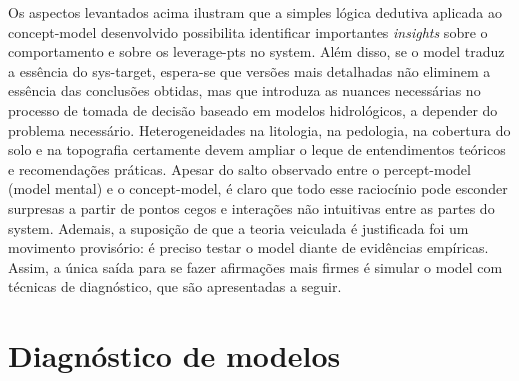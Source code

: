 \documentclass[./main.tex]{subfiles}
\begin{document}
\par Os aspectos levantados acima ilustram que a simples lógica dedutiva aplicada ao \gls{concept-model} desenvolvido possibilita identificar importantes \textit{insights} sobre o comportamento e sobre os \gls{leverage-pts} no \gls{system}. Além disso, se o \gls{model} traduz a essência do \gls{sys-target}, espera-se que versões mais detalhadas não eliminem a essência das conclusões obtidas, mas que introduza as nuances necessárias no processo de tomada de decisão baseado em modelos hidrológicos, a depender do problema necessário. Heterogeneidades na litologia, na pedologia, na cobertura do solo e na topografia certamente devem ampliar o leque de entendimentos teóricos e recomendações práticas. Apesar do salto observado entre o \gls{percept-model} (\gls{model} mental) e o \gls{concept-model}, é claro que todo esse raciocínio pode esconder surpresas a partir de pontos cegos e interações não intuitivas entre as partes do \gls{system}. Ademais, a suposição de que a \gls{teoria} veiculada é justificada foi um movimento provisório: é preciso testar o \gls{model} diante de evidências empíricas. Assim, a única saída para se fazer afirmações mais firmes é simular o \gls{model} com técnicas de diagnóstico, que são apresentadas a seguir.

\section{Diagnóstico de modelos} \label{sec:sys:diags}
\end{document}
